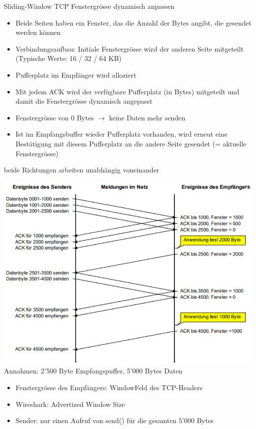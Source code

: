 \begin{KR}{Sliding-Window TCP} Fenstergrösse dynamisch anpassen

    \begin{itemize}
        \item Beide Seiten haben ein Fenster, das die Anzahl der Bytes angibt, die gesendet werden können
        \item Verbindungsaufbau: Initiale Fenstergrösse wird der anderen Seite mitgeteilt (Typische Werte: 16 / 32 / 64 KB)
        \item Pufferplatz im Empfänger wird alloziert
        \item Mit jedem ACK wird der verfügbare Pufferplatz (in Bytes) mitgeteilt und damit die Fenstergrösse dynamisch angepasst
        \item Fenstergrösse von 0 Bytes $\rightarrow$ keine Daten mehr senden
        \item Ist im Empfangsbuffer wieder Pufferplatz vorhanden, wird erneut eine Bestätigung mit diesem Pufferplatz an die andere Seite gesendet (= aktuelle Fenstergrösse)
    \end{itemize}
    {\small beide Richtungen arbeiten unabhängig voneinander}
\end{KR}



\begin{example}
        \includegraphics[width=1\linewidth]{images/flusssteuerung_tcp.png}\\
    Annahmen: 2'500 Byte Empfangspuffer, 5'000 Bytes Daten
    \begin{itemize}
        \item Fenstergrösse des Empfängers: WindowFeld des TCP-Headers
        \item Wireshark: Advertized Window Size
        \item Sender: nur einen Aufruf von send() für die gesamten 5'000 Bytes
    \end{itemize}
\end{example}



